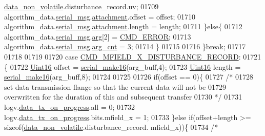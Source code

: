 \begin{DoxyCode}
{{{{{      \hyperlink{a00060_a76ac5f917f5308dcd83de0d7c94559fb}{data\_non\_volatile}.disturbance\_record.uv;
01709                        algorithm\_data.\hyperlink{a00016_afcf5f557aea688aad985eec15269c1da}{serial\_msg}.\hyperlink{a00031_a040f6d5d58d18d8aeaf447eda7f50172}{attachment}.offset      = offset;
01710                        algorithm\_data.\hyperlink{a00016_afcf5f557aea688aad985eec15269c1da}{serial\_msg}.\hyperlink{a00031_a040f6d5d58d18d8aeaf447eda7f50172}{attachment}.length      = length;
01711                      \}\textcolor{keywordflow}{else}\{
01712                          algorithm\_data.\hyperlink{a00016_afcf5f557aea688aad985eec15269c1da}{serial\_msg}.\hyperlink{a00031_af7d6f762438c80072bd9dc0e4dd4ae1e}{arg}[2]               = 
      \hyperlink{a00021_a1764a522e9c1a59a59be8757c69fa494}{CMD\_ERROR};
01713                          algorithm\_data.\hyperlink{a00016_afcf5f557aea688aad985eec15269c1da}{serial\_msg}.\hyperlink{a00031_a7b79f40e2eeec288091afd340bf8f591}{arg\_cnt}              = 3;
01714                      \}
01715 
01716                 \}\textcolor{keywordflow}{break};
01717 
01718 
01719 
01720                 \textcolor{keywordflow}{case}  \hyperlink{a00021_ab84aea346a3f75b58f8bda67b8ae9be0}{CMD\_MFIELD\_X\_DISTURBANCE\_RECORD}:
01721                 \{
01722                     \hyperlink{a00072_a59a9f6be4562c327cbfb4f7e8e18f08b}{Uint16} offset = \hyperlink{a00031_abc17de32f14103a5be219df0d4ad9176}{serial\_make16}(arg\_buff,4);
01723                     \hyperlink{a00072_a59a9f6be4562c327cbfb4f7e8e18f08b}{Uint16} length = \hyperlink{a00031_abc17de32f14103a5be219df0d4ad9176}{serial\_make16}(arg\_buff,8);
01724 
01725 
01726                     \textcolor{keywordflow}{if}(offset == 0)\{
01727                          \textcolor{comment}{/*}
01728 \textcolor{comment}{                         set data transmission flange so that the current data will not be}
01729 \textcolor{comment}{                         overwritten for the duration of this and subsequent transfer}
01730 \textcolor{comment}{                       */}
01731                         logv.\hyperlink{a00021_a6cdefde69642ef511e3252c38be68516}{data\_tx\_on\_progress}.all       = 0;
01732                         logv.\hyperlink{a00021_a6cdefde69642ef511e3252c38be68516}{data\_tx\_on\_progress}.bits.mfield\_x   = 1;
01733                     \}\textcolor{keywordflow}{else} \textcolor{keywordflow}{if}(offset+length >= \textcolor{keyword}{sizeof}(\hyperlink{a00060_a76ac5f917f5308dcd83de0d7c94559fb}{data\_non\_volatile}.disturbance\_record.
      mfield\_x))\{
01734                         \textcolor{comment}{/*}
}}}}}
\end{DoxyCode}

